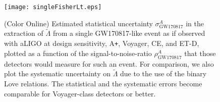 \documentclass[prd,twocolumn,nofootinbib,superscriptaddress,amsmath,amssymb]{revtex4-1}
\begin{document}
\begin{figure}
\begin{center} 
\texttt{[image: singleFisherLt.eps]}
\end{center}
\caption{(Color Online) Estimated statistical uncertainty $\sigma^A_{\text{GW170817}}$ in the extraction of $\tilde\Lambda$ from a single GW170817-like event as if observed with aLIGO at design sensitivity, A\texttt{+}, Voyager, CE, and ET-D, plotted as a function of the signal-to-noise-ratio $\rho^A_{\text{GW170817}}$ that those detectors would measure for such an event. For comparison, we also plot the systematic uncertainty on $\tilde\Lambda$ due to the use of the binary Love relations. The statistical and the systematic errors become comparable for Voyager-class detectors or better.
}
\label{fig:singleFisherLt}
\end{figure} 
\end{document}
